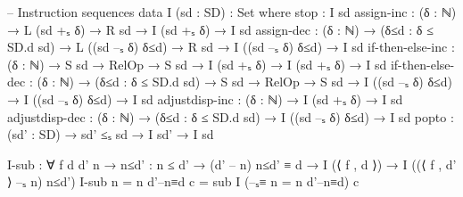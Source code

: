 \documentclass{article}
\begin{document}
\begin{prev}
\begin{code}
-- Instruction sequences
data I (sd : SD) : Set where
    stop : I sd
    assign-inc : (δ : ℕ) → L (sd +ₛ δ) → R sd → I (sd +ₛ δ) → I sd
    assign-dec : (δ : ℕ) → (δ≤d : δ ≤ SD.d sd) → L ((sd –ₛ δ) δ≤d) 
                    → R sd → I ((sd –ₛ δ) δ≤d) → I sd
    if-then-else-inc : (δ : ℕ) → S sd → RelOp → S sd 
                            → I (sd +ₛ δ) → I (sd +ₛ δ) → I sd
    if-then-else-dec : (δ : ℕ) → (δ≤d : δ ≤ SD.d sd) 
                            → S sd → RelOp → S sd 
                            → I ((sd –ₛ δ) δ≤d) 
                            → I ((sd –ₛ δ) δ≤d) → I sd
    adjustdisp-inc : (δ : ℕ) → I (sd +ₛ δ) → I sd
    adjustdisp-dec : (δ : ℕ) → (δ≤d : δ ≤ SD.d sd) 
                        → I ((sd –ₛ δ) δ≤d) → I sd
    popto : (sd' : SD) → sd' ≤ₛ sd → I sd' → I sd 


I-sub : ∀ {f d d' n} → {n≤d' : n ≤ d'} → (d' – n) n≤d' ≡ d 
            → I (⟨ f , d ⟩) → I ((⟨ f , d' ⟩ –ₛ n) n≤d')
I-sub {n = n} d'–n≡d c = sub I (–ₛ≡ {n = n} d'–n≡d) c 
\end{code}
\end{prev}
\end{document}

